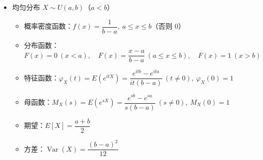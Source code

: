 \begin{itemize}
  \item 均匀分布 $X\sim U(a,b)$（$a<b$）
  \begin{itemize}
    \item 概率密度函数：$f(x)=\dfrac{1}{b-a},\ a\le x\le b$（否则 $0$）
    \item 分布函数：$F(x)=0\ (x<a),\quad F(x)=\dfrac{x-a}{b-a}\ (a\le x\le b),\quad F(x)=1\ (x>b)$
    \item 特征函数：$\varphi_X(t)=E(e^{itX})=\dfrac{e^{itb}-e^{ita}}{it(b-a)}\ (t\ne 0),\ \varphi_X(0)=1$
    \item 母函数：$M_X(s)=E(e^{sX})=\dfrac{e^{sb}-e^{sa}}{s(b-a)}\ (s\ne 0),\ M_X(0)=1$
    \item 期望：$E[X]=\dfrac{a+b}{2}$
    \item 方差：$\operatorname{Var}(X)=\dfrac{(b-a)^2}{12}$
  \end{itemize}
\end{itemize}